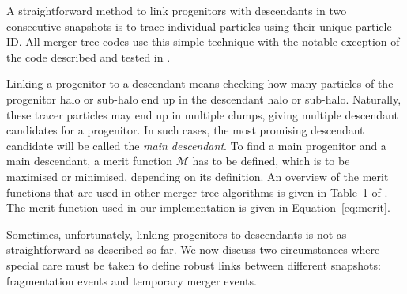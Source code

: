 A straightforward method to link progenitors with descendants in two
consecutive snapshots is to trace individual particles using their
unique particle ID. All merger tree codes use this simple technique
\citep[][]{behrooziGravitationallyConsistentHalo2013,
  springelSimulationsFormationEvolution2005a, jiangNbodyDarkMatter2014,
  knebeImpactBaryonicPhysics2010, tweedBuildingMergerTrees2009,
  elahiClimbingHaloMerger2019, jungEffectsLargescaleEnvironment2014,
  rodriguez-gomezMergerRateGalaxies2015} with the notable exception of
the code  described and tested in
\cite{SUSSING_COMPARISON}.

Linking a progenitor to a descendant means checking how many particles
of the progenitor halo or sub-halo end up in the descendant halo or
sub-halo.  Naturally, these tracer particles may end up in multiple
clumps, giving multiple descendant candidates for a progenitor.  In
such cases, the most promising descendant candidate will be called the
\emph{main descendant}.  To find a main progenitor and a main
descendant, a merit function $\mathcal{M}$ has to be defined, which is
to be maximised or minimised, depending on its definition.  An
overview of the merit functions that are used in other merger tree
algorithms is given in Table~1 of \cite{SUSSING_COMPARISON}.  The
merit function used in our implementation is given in
Equation~\ref{eq:merit}.

Sometimes, unfortunately, linking progenitors to descendants is not as
straightforward as described so far. We now discuss two circumstances
where special care must be taken to define robust links between
different snapshots: fragmentation events and temporary merger events.


